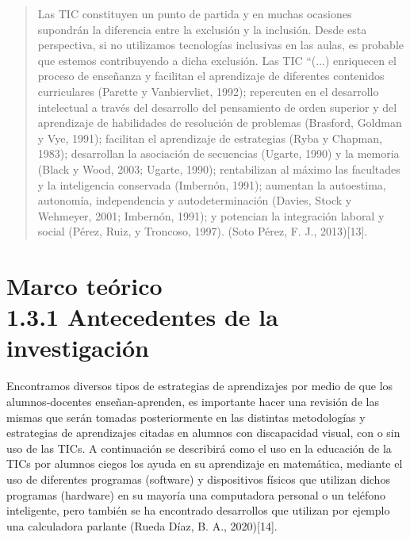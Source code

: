 \documentclass{article}
\begin{document}
\begin{quote}
{\changefontsizes{8.8pt}
	Las TIC constituyen un punto de partida y en muchas ocasiones supondrán la diferencia entre la exclusión y la inclusión. Desde esta perspectiva, si no utilizamos tecnologías inclusivas en las aulas, es probable que estemos contribuyendo a dicha exclusión. Las TIC “(...) enriquecen el proceso de enseñanza y facilitan el aprendizaje de diferentes contenidos curriculares (Parette y Vanbiervliet, 1992); repercuten en el desarrollo intelectual a través del desarrollo del pensamiento de orden superior y del aprendizaje de habilidades de resolución de problemas (Brasford, Goldman y Vye, 1991); facilitan el aprendizaje de estrategias (Ryba y Chapman, 1983); desarrollan la asociación de secuencias (Ugarte, 1990) y la memoria (Black y Wood, 2003; Ugarte, 1990); rentabilizan al máximo las facultades y la inteligencia conservada (Imbernón, 1991); aumentan la autoestima, autonomía, independencia y autodeterminación (Davies, Stock y Wehmeyer, 2001; Imbernón, 1991); y potencian la integración laboral y social (Pérez, Ruiz, y Troncoso, 1997). (Soto Pérez, F. J., 2013)[13].
}
\end{quote}

\section{\fontsize{10pt}{14pt} Marco teórico\\
	1.3.1 Antecedentes de la investigación}

{\changefontsizes{8.8pt}
Encontramos diversos tipos de estrategias de aprendizajes por medio de que los alumnos-docentes enseñan-aprenden, es importante hacer una revisión de las mismas que serán tomadas posteriormente en las distintas metodologías y estrategias de aprendizajes citadas en  alumnos con discapacidad visual, con o sin uso de las TICs.
A continuación se describirá como el uso en la educación de la TICs por alumnos ciegos los ayuda en su aprendizaje en matemática, mediante el uso de diferentes programas (software) y dispositivos físicos que utilizan dichos programas (hardware) en su mayoría una computadora personal o un teléfono inteligente, pero también se ha encontrado desarrollos que utilizan por ejemplo una calculadora parlante (Rueda Díaz, B. A., 2020)[14].
}
\end{document}
